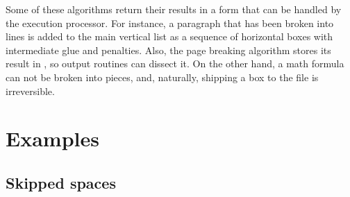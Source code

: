 \documentclass{book}
\begin{document}
Some of these algorithms return their results in a form that
can be handled by the execution processor. For instance,
a paragraph that has been broken into lines is added to
the main vertical list as a sequence of horizontal boxes
with intermediate glue and penalties. Also, the page breaking
algorithm stores its result in , so output
routines can dissect it. On the other hand, a math formula
can not be broken into pieces, and, naturally, 
shipping a box to the  file is irreversible.

\section{Examples}

\subsection{Skipped spaces}
\end{document}
